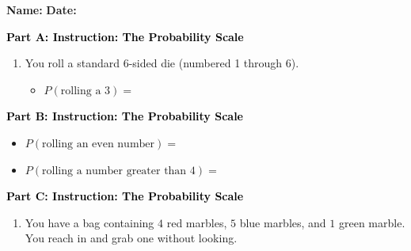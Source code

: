 \documentclass[12pt, letterpaper, fleqn]{article}
\newcommand{\blank}{\underline{\hspace{2.2cm}}}
\begin{document}
\textbf{Name:} \underline{\hspace{5cm}}
\hfill
\textbf{Date:} \underline{\hspace{3cm}}\\

\begin{tcolorbox}[colback=customteal!20]
\large\textcolor{black}{\textbf{Part A: Instruction: The Probability Scale}}
\end{tcolorbox}

\vspace{3mm}

\begin{enumerate}[itemsep=2.2cm, leftmargin=0.6cm]
\item You roll a standard 6-sided die (numbered 1 through 6).
\begin{itemize}
\item $P(\text{rolling a 3}) =$ \blank
\end{itemize}
\end{enumerate}

\newpage

\begin{tcolorbox}[colback=customteal!20]
\large\textcolor{black}{\textbf{Part B: Instruction: The Probability Scale}}
\end{tcolorbox}

\vspace{3mm}

\begin{enumerate}[itemsep=2.2cm, leftmargin=0.6cm, resume]
\begin{itemize}
\item $P(\text{rolling an even number}) =$ \blank
\item $P(\text{rolling a number greater than 4}) =$ \blank
\end{itemize}
\end{enumerate}

\newpage

\begin{tcolorbox}[colback=customteal!20]
\large\textcolor{black}{\textbf{Part C: Instruction: The Probability Scale}}
\end{tcolorbox}

\vspace{3mm}

\begin{enumerate}[itemsep=2.2cm, leftmargin=0.6cm, resume]
\begin{itemize}
\item $P(\text{rolling a 7}) =$ \blank
\end{itemize}
\item You have a bag containing $4$ red marbles, $5$ blue marbles, and $1$ green marble. You reach in and grab one without looking.
\end{enumerate}
\end{document}
